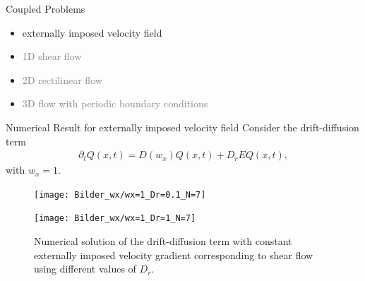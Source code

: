 
\begin{frame}{Coupled Problems}
	\begin{itemize}
		\item externally imposed velocity field \checkmark
		\item \textcolor{gray}{1D shear flow} \checkmark
         \item \textcolor{gray}{2D rectilinear flow \checkmark}
         \item \textcolor{gray}{3D flow with periodic boundary conditions}
	\end{itemize}
\end{frame}

\begin{frame}{Numerical Result for externally imposed velocity field}
		\scriptsize
	Consider the drift-diffusion term 
	\begin{align*}
		\partial_t Q(x,t)=D(w_x)Q(x,t)+ D_rEQ(x,t),
	\end{align*}
	with $w_x=1$.
		\begin{figure}[H]
			\centering
			\begin{minipage}{0.45\textwidth}
				\texttt{[image: Bilder\_wx/wx=1\_Dr=0.1\_N=7]}
			\end{minipage}
			\hfill 
			\begin{minipage}{0.45\textwidth}
				\texttt{[image: Bilder\_wx/wx=1\_Dr=1\_N=7]}
			\end{minipage}
			\caption{Numerical solution of the drift-diffusion term with constant externally imposed velocity gradient corresponding to shear flow using different values of $D_r$.}	
		\end{figure}
\end{frame}

